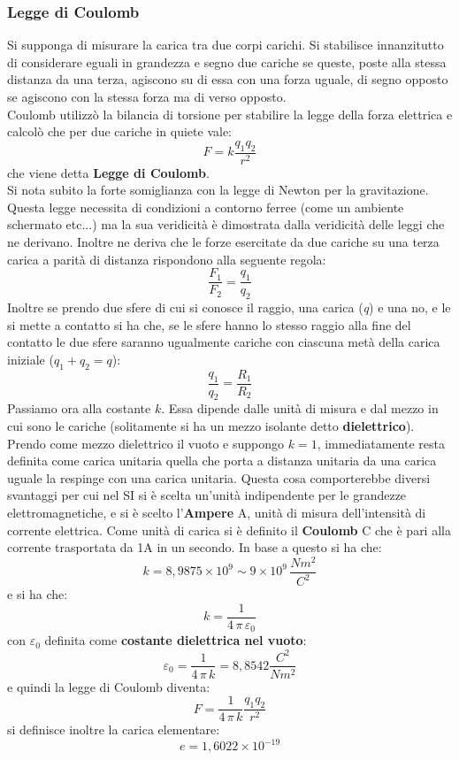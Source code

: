 \documentclass[a4paper,12pt, oneside]{book}
\begin{document}
\subsubsection{Legge di Coulomb}
Si supponga di misurare la carica tra due corpi carichi. Si stabilisce innanzitutto di considerare eguali in grandezza e segno due cariche se queste, poste alla stessa distanza da una terza, agiscono su di essa con una forza uguale, di segno opposto se agiscono con la stessa forza ma di verso opposto.\\
Coulomb utilizzò la bilancia di torsione per stabilire la legge della forza elettrica e calcolò che per due cariche in quiete vale:
$$F=k\frac{q_1q_2}{r^2}$$
che viene detta \textbf{Legge di Coulomb}.\\
Si nota subito la forte somiglianza con la legge di Newton per la gravitazione. Questa legge necessita di condizioni a contorno ferree (come un ambiente schermato etc...) ma la sua veridicità è dimostrata dalla veridicità delle leggi che ne derivano. Inoltre ne deriva che le forze esercitate da due cariche su una terza carica a parità di distanza rispondono alla seguente regola:
$$\frac{F_1}{F_2}=\frac{q_1}{q_2}$$
Inoltre se prendo due sfere di cui si conosce il raggio, una carica (\textit{q}) e una no, e le si mette a contatto si ha che, se le sfere hanno lo stesso raggio alla fine del contatto le due sfere saranno ugualmente cariche con ciascuna metà della carica iniziale ($q_1+q_2=q$):
$$\frac{q_1}{q_2}=\frac{R_1}{R_2}$$
Passiamo ora alla costante $k$. Essa dipende dalle unità di misura e dal mezzo in cui sono le cariche (solitamente si ha un mezzo isolante detto \textbf{dielettrico}). Prendo come mezzo dielettrico il vuoto e suppongo $k=1$, immediatamente resta definita come carica unitaria quella che porta a distanza unitaria da una carica uguale la respinge con una carica unitaria. Questa cosa comporterebbe diversi svantaggi per cui nel SI si è scelta un'unità indipendente per le grandezze elettromagnetiche, e si è scelto l'\textbf{Ampere} A, unità di misura dell'intensità di corrente elettrica. Come unità di carica si è definito il \textbf{Coulomb} C che è pari alla corrente trasportata da 1A in un secondo. In base a questo si ha che:
$$k=8,9875\times 10^9\sim 9\times 10^9\,\frac{Nm^2}{C^2}$$
e si ha che:
$$k=\frac{1}{4\,\pi\,\varepsilon_0}$$
con $\varepsilon_0$ definita come \textbf{costante dielettrica nel vuoto}:
$$\varepsilon_0=\frac{1}{4\,\pi\,k}=8,8542\frac{C^2}{Nm^2}$$
e quindi la legge di Coulomb diventa:
$$F=\frac{1}{4\,\pi\,k}\frac{q_1q_2}{r^2}$$
si definisce inoltre la carica elementare:
$$e=1,6022\times 10^{-19}$$
\end{document}
